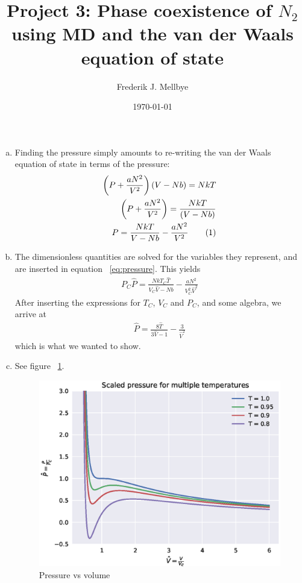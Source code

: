 \documentclass[aps,reprint]{revtex4-1}
\newcommand\numberthis{\addtocounter{equation}{1}\tag{\theequation}}
\begin{document}
\title{Project 3: Phase coexistence of $N_2$ using MD and the van der Waals equation of state}
\author{Frederik J. Mellbye}
\date{\today}

\maketitle
\makeatletter
\makeatother

\begin{enumerate}[(a)]

  \item Finding the pressure simply amounts to re-writing the van der Waals
  equation of state in terms of the pressure:
  \begin{align*}
    \left(P + \frac{aN^2}{V^2}\right)(V- Nb) = NkT \\
    \left(P + \frac{aN^2}{V^2}\right) = \frac{NkT}{(V- Nb)} \\
    P = \frac{NkT}{V-Nb} - \frac{aN^2}{V^2} \numberthis \label{eq:pressure}
  \end{align*}

  \item The dimensionless quantities are solved for the variables they represent,
  and are inserted in equation ~\ref{eq:pressure}. This yields
  \begin{align*}
    P_C \hat{P} = \frac{NkT_C \hat{T}}{V_C \hat{V} - Nb} - \frac{a N^2}{V_C^2 \hat{V}^2}
  \end{align*}
  After inserting the expressions for $T_C$, $V_C$ and $P_C$, and some algebra,
  we arrive at
  \begin{align}
    \label{eq:scaledpressure}
    \hat{P} = \frac{8\hat{T}}{3\hat{V} - 1} - \frac{3}{\hat{V}^2}
  \end{align}
  which is what we wanted to show.

  \item See figure ~\ref{fig:pressure}.
  \begin{figure}[H]
    \centering
    \includegraphics[width=\columnwidth]{figures/pressure_v.eps}
    \caption{Pressure vs volume}
    \label{fig:pressure}
  \end{figure}


\end{enumerate}
\end{document}
